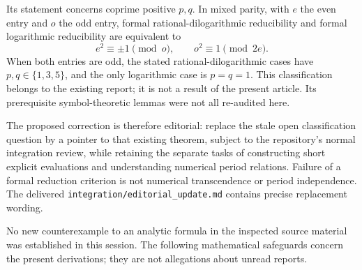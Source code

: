 \documentclass[11pt,letterpaper]{article}
\numberwithin{equation}{section}
\theoremstyle{definition}
\newcommand{\qfile}[1]{\nolinkurl{#1}}
\begin{document}
Its statement concerns coprime positive $p,q$. In mixed parity, with
$e$ the even entry and $o$ the odd entry, formal rational-dilogarithmic
reducibility and formal logarithmic reducibility are equivalent to
\begin{equation}\label{qspec:eq:existing-J-status}
e^2\equiv\pm1\pmod o,\qquad o^2\equiv1\pmod{2e}.
\end{equation}
When both entries are odd, the stated rational-dilogarithmic cases have
$p,q\in\{1,3,5\}$, and the only logarithmic case is $p=q=1$.
This classification belongs to the existing report; it is not a result
of the present article. Its prerequisite symbol-theoretic lemmas were
not all re-audited here.

The proposed correction is therefore editorial: replace the stale open
classification question by a pointer to that existing theorem, subject
to the repository's normal integration review, while retaining the
separate tasks of constructing short explicit evaluations and understanding
numerical period relations. Failure of a formal reduction criterion is
not numerical transcendence or period independence. The delivered
\qfile{integration/editorial_update.md} contains precise replacement wording.

No new counterexample to an analytic formula in the inspected source
material was established in this session. The following mathematical
safeguards concern the present derivations; they are not allegations
about unread reports.
\end{document}
